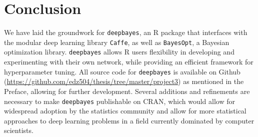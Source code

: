 \documentclass[master]{subfiles}
\begin{document}
\section{Conclusion}
We have laid the groundwork for \lstinline{deepbayes}, an R package that interfaces with the modular deep learning library \lstinline{Caffe}, as well as \lstinline{BayesOpt}, a Bayesian optimization library.  \lstinline{deepbayes} allows R users flexibility in developing and experimenting with their own network, while providing an efficient framework for hyperparameter tuning.  All source code for \lstinline{deepbayes} is available on Github (\url{https://github.com/edz504/thesis/tree/master/project3}) as mentioned in the Preface, allowing for further development.  Several additions and refinements are necessary to make \lstinline{deepbayes} publishable on CRAN, which would allow for widespread adoption by the statistics community and allow for more statistical approaches to deep learning problems in a field currently dominated by computer scientists.
\end{document}
